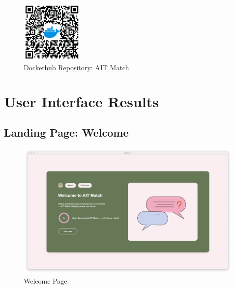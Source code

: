         \begin{figure}[h]
        \centering
        \includegraphics[width=1.2in]{figures/qr-code-dockerhub.png} 
        \captionsetup{justification=centering, singlelinecheck=false, labelsep=space}
        \caption{\href{https://hub.docker.com/repository/docker/werrnnnwerrrnnnnnn/match_web/general}{Dockerhub Repository: AIT Match}}
        \label{fig:dockerhub_qr}
        \end{figure}

    \newpage
    \section{User Interface Results}
    
        \subsection{Landing Page: Welcome}
        \begin{figure}[h]
                \centering
                \captionsetup{justification=centering, singlelinecheck=false, labelsep=space}
                \includegraphics[width=5in]{figures/results/landing-page/welcome-page.png} 
                \caption{Welcome Page.}
                \label{fig:welcome-page}
            \end{figure}  

